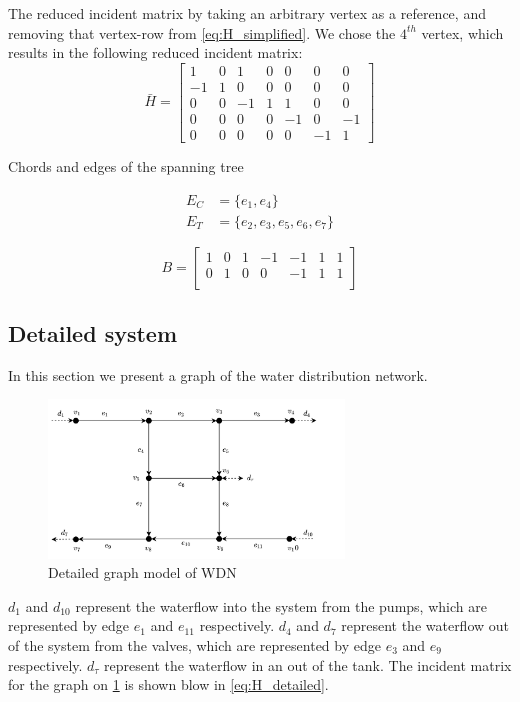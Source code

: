 The reduced incident matrix by taking an arbitrary vertex as a reference, and removing that vertex-row from \cref{eq:H_simplified}. We chose the $4^{th}$ vertex, which results in the following reduced incident matrix:
\begin{equation}
	\bar{H} = \begin{bmatrix}
		1 & 0 & 1 & 0 & 0 & 0 & 0\\
		-1 & 1 & 0 & 0 & 0 & 0 & 0\\
		0 & 0 & -1 & 1 & 1 & 0 & 0\\
		0 & 0 & 0 & 0 & -1 &  0  & -1\\
		0 & 0 & 0 & 0 & 0 & -1 & 1
	\end{bmatrix}
\end{equation}

Chords and edges of the spanning tree

\begin{equation} 
	\begin{split}
		E_{C} &= \{e_{1},e_{4}\}   \\ E_{T} &= \{e_2,e_3,e_5,e_6,e_7\}
	\end{split}
\end{equation}


\begin{equation}
	B = \begin{bmatrix}
		1 & 0 & 1 & -1 & -1 & 1 & 1\\
		0 & 1 & 0 & 0 & -1 & 1 & 1\\
	\end{bmatrix}
\end{equation}
\newpage

\subsection{Detailed system}
In this section we present a graph of the water distribution network.

\begin{figure}[h]
	\centering
	\includegraphics[width=0.7\textwidth]{Pictures/GraphDetailed.png}
	\caption{Detailed graph model of WDN} 
		\label{fig:WDNDetailed}
	\end{figure}
$ d_1 $ and $ d_{10} $ represent the waterflow into the system from the pumps, which are represented by edge $ e_1 $ and $ e_{11} $ respectively.
$ d_4 $ and $ d_7 $ represent the waterflow out of the system from the valves, which are represented by edge $ e_3 $ and $ e_9 $ respectively.
$ d_\tau $ represent the waterflow in an out of the tank.
The incident matrix for the graph on \cref{fig:WDNDetailed} is shown blow in \cref{eq:H_detailed}.
	
